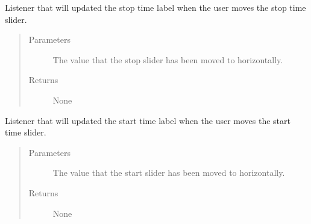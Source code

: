 \documentclass[letterpaper,10pt,english]{sphinxmanual}
\begin{document}
\begin{fulllineitems}
\begin{fulllineitems}
\label{\detokenize{index:src.Views.View_ReportScreen.ReportWindow.handleEndSliderValueChange}}
Listener that will updated the stop time label when the user moves the stop
time slider.
\begin{quote}\begin{description}
\item[{Parameters}] \leavevmode
{} \textendash{} The value that the stop slider has been moved to horizontally.

\item[{Returns}] \leavevmode
None

\end{description}\end{quote}

\end{fulllineitems}


\begin{fulllineitems}
\label{\detokenize{index:src.Views.View_ReportScreen.ReportWindow.handleStartSliderValueChange}}
Listener that will updated the start time label when the user moves the start
time slider.
\begin{quote}\begin{description}
\item[{Parameters}] \leavevmode
{} \textendash{} The value that the start slider has been moved to horizontally.

\item[{Returns}] \leavevmode
None

\end{description}\end{quote}

\end{fulllineitems}



\end{fulllineitems}
\end{document}
